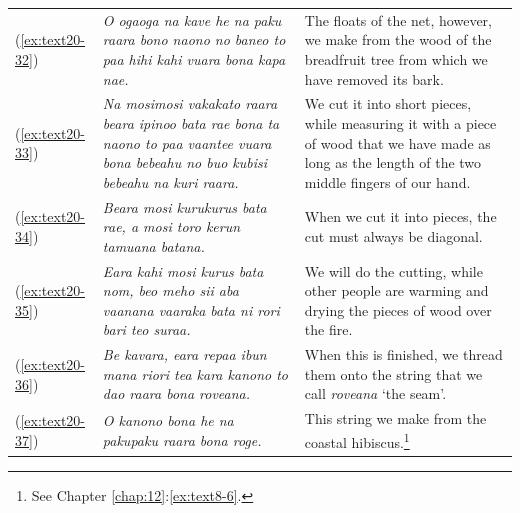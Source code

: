 \documentclass[output=paper]{langscibook}
\begin{document}
\begin{xltabular}{\textwidth}{lXX}
	(\ref{ex:text20-32})&\textit{O ogaoga na kave he na paku raara bono naono no baneo to paa hihi kahi vuara bona kapa nae.}&The floats of the net, however, we make from the wood of the breadfruit tree from which we have removed its bark.\\
	(\ref{ex:text20-33})&\textit{Na mosimosi vakakato raara beara ipinoo bata rae bona ta naono to paa vaantee vuara bona bebeahu no buo kubisi bebeahu na kuri raara.}&We cut it into short pieces, while measuring it with a piece of wood that we have made as long as the length of the two middle fingers of our hand.\\
	(\ref{ex:text20-34})&\textit{Beara mosi kurukurus bata rae, a mosi toro kerun tamuana batana.}&When we cut it into pieces, the cut must always be diagonal.\\
	(\ref{ex:text20-35})&\textit{Eara kahi mosi kurus bata nom, beo meho sii aba vaanana vaaraka bata ni rori bari teo suraa.}&We will do the cutting, while other people are warming and drying the pieces of wood over the fire.\\
	(\ref{ex:text20-36})&\textit{Be kavara, eara repaa ibun mana riori tea kara kanono to dao raara bona roveana.}&When this is finished, we thread them onto the string that we call \textit{roveana} `the seam'.\\
	(\ref{ex:text20-37})&\textit{O kanono bona he na pakupaku raara bona roge.}&This string we make from the coastal hibiscus.\footnote{See Chapter \ref{chap:12}:\ref{ex:text8-6}.}\\
\end{xltabular}
\end{document}
